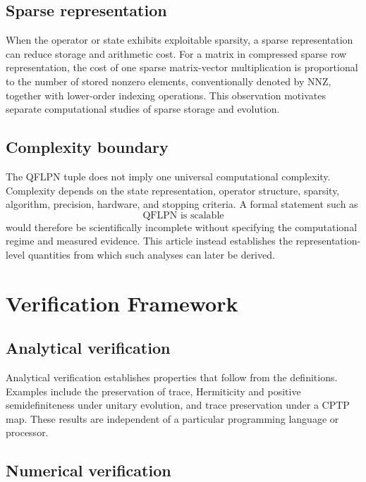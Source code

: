\documentclass[final,3p,times]{elsarticle}
\begin{document}
\subsection{Sparse representation}

When the operator or state exhibits exploitable sparsity, a sparse representation can reduce storage and arithmetic cost. For a matrix in compressed sparse row representation, the cost of one sparse matrix-vector multiplication is proportional to the number of stored nonzero elements, conventionally denoted by $\mathrm{NNZ}$, together with lower-order indexing operations. This observation motivates separate computational studies of sparse storage and evolution.

\subsection{Complexity boundary}

The QFLPN tuple does not imply one universal computational complexity. Complexity depends on the state representation, operator structure, sparsity, algorithm, precision, hardware, and stopping criteria. A formal statement such as
\begin{equation}
    \text{QFLPN is scalable}
\end{equation}
would therefore be scientifically incomplete without specifying the computational regime and measured evidence. This article instead establishes the representation-level quantities from which such analyses can later be derived.

\section{Verification Framework}

\subsection{Analytical verification}

Analytical verification establishes properties that follow from the definitions. Examples include the preservation of trace, Hermiticity and positive semidefiniteness under unitary evolution, and trace preservation under a CPTP map. These results are independent of a particular programming language or processor.

\subsection{Numerical verification}
\end{document}
